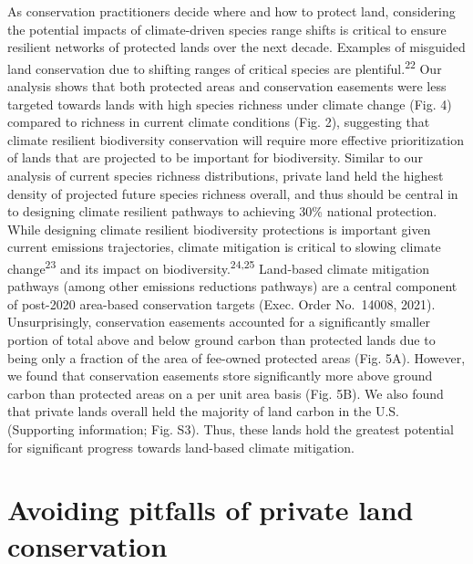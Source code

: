 \documentclass[3p]{elsarticle} %
\begin{document}
As conservation practitioners decide where and how to protect land,
considering the potential impacts of climate-driven species range shifts
is critical to ensure resilient networks of protected lands over the
next decade. Examples of misguided land conservation due to shifting
ranges of critical species are plentiful.\textsuperscript{22} Our
analysis shows that both protected areas and conservation easements were
less targeted towards lands with high species richness under climate
change (Fig. 4) compared to richness in current climate conditions (Fig.
2), suggesting that climate resilient biodiversity conservation will
require more effective prioritization of lands that are projected to be
important for biodiversity. Similar to our analysis of current species
richness distributions, private land held the highest density of
projected future species richness overall, and thus should be central in
to designing climate resilient pathways to achieving 30\% national
protection. While designing climate resilient biodiversity protections
is important given current emissions trajectories, climate mitigation is
critical to slowing climate change\textsuperscript{23} and its impact on
biodiversity.\textsuperscript{24,25} Land-based climate mitigation
pathways (among other emissions reductions pathways) are a central
component of post-2020 area-based conservation targets (Exec. Order
No.~14008, 2021). Unsurprisingly, conservation easements accounted for a
significantly smaller portion of total above and below ground carbon
than protected lands due to being only a fraction of the area of
fee-owned protected areas (Fig. 5A). However, we found that conservation
easements store significantly more above ground carbon than protected
areas on a per unit area basis (Fig. 5B). We also found that private
lands overall held the majority of land carbon in the U.S. (Supporting
information; Fig. S3). Thus, these lands hold the greatest potential for
significant progress towards land-based climate mitigation.

\hypertarget{avoiding-pitfalls-of-private-land-conservation}{%
\section{Avoiding pitfalls of private land
conservation}\label{avoiding-pitfalls-of-private-land-conservation}}
\end{document}
